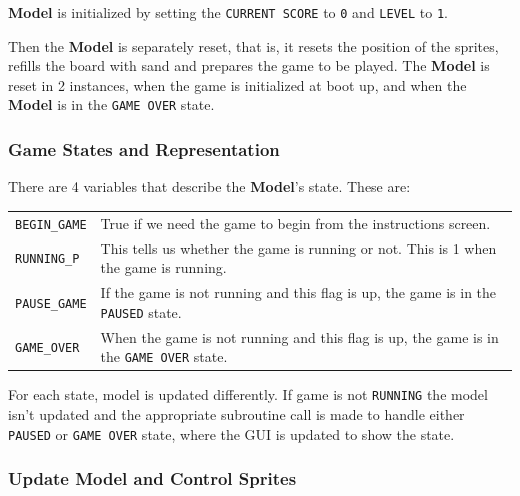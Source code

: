     \textbf{Model} is initialized by setting the \texttt{CURRENT SCORE} to \texttt{0} and \texttt{LEVEL} to \texttt{1}.

    Then the \textbf{Model} is separately reset, that is, it resets the position of the sprites, refills the board with sand and prepares the game to be played.
    The \textbf{Model} is reset in 2 instances, when the game is initialized at boot up, and when the \textbf{Model} is in the \texttt{GAME OVER} state.

    \subsubsection{Game States and Representation}

    There are 4 variables that describe the \textbf{Model}'s state. These are:

    \begin{table}[H]
      \begin{tabular}{ll}
	\texttt{BEGIN\_GAME}	&   True if we need the game to begin from the instructions screen. \\
	\texttt{RUNNING\_P}	&   This tells us whether the game is running or not. This is 1 when the game is running. \\
	\texttt{PAUSE\_GAME}	&   If the game is not running and this flag is up, the game is in the \texttt{PAUSED} state.\\
	\texttt{GAME\_OVER}	&   When the game is not running and this flag is up, the game is in the \texttt{GAME OVER} state.
      \end{tabular}
    \end{table}

    For each state, model is updated differently. If game is not \texttt{RUNNING} the model isn't updated and the appropriate subroutine call is made to handle either \texttt{PAUSED} or \texttt{GAME OVER} state, where the GUI is updated to show the state.

    \subsubsection{Update Model and Control Sprites}

